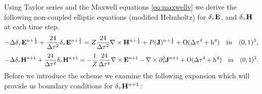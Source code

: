 \documentclass[12pt,reqno]{amsart}
\newcommand{\e}{{\bf E}}
\newcommand{\h}{{\bf H}}
\newcommand{\J}{{\bf J}}
\theoremstyle{definition}
\numberwithin{equation}{section}
\begin{document}
	Using  Taylor series and the Maxwell equations \eqref{eq:maxwellv} 
	we derive the following non-coupled  elliptic equations (modified Helmholtz) for
$	\delta_{\tau} \bf{E}$, and $\delta_{\tau} \bf{H}$
at each time step.
	$$
	-\Delta\delta_{\tau} \e^{n+\frac{1}{2}}+\frac{24}{\Delta \tau^2}\delta_{\tau}\e^{n+\frac{1}{2}}=
	Z\frac{24}{\Delta \tau^2}\nabla\times \h^{n+\frac{1}{2}}+P(\J)^{n+\frac{1}{2}}+
	\mathrm{O(\Delta \tau^4+h^4)} \quad {\mathrm in} \quad (0,1)^3,
	$$
		$$
	-\Delta \delta_{\tau}\h^{n+1}+\frac{24}{\Delta \tau^2}\delta_{\tau}\h^{n+1}=
	-\frac{1}{Z}\frac{24}{\Delta \tau^2}\nabla\times \e^{n+1}
	-\nabla\times\partial_{\tau}^2\J^{n+1}+
	\mathrm{O(\Delta \tau^4+h^4)} 
	\quad {\mathrm in} \quad (0,1)^3.
	$$
   Before we introduce the scheme we examine the following expansion which will provide us boundary conditions for $\delta_\tau \h^{n+1}$:
\end{document}
